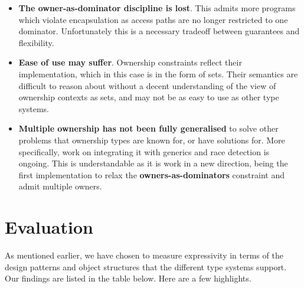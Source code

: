 \documentclass{acm_proc_article-sp}
\begin{document}
\begin{itemize}

    \item \textbf{The owner-as-dominator discipline is lost}. This admits more
        programs which violate encapsulation as access paths are no longer
        restricted to one dominator. Unfortunately this is a necessary tradeoff
        between guarantees and flexibility.

    \item \textbf{Ease of use may suffer}. Ownership constraints reflect their
        implementation, which in this case is in the form of sets. Their
        semantics are difficult to reason about without a decent understanding
        of the view of ownership contexts as sets, and may not be as easy to use
        as other type systems.

    \item \textbf{Multiple ownership has not been fully generalised} to solve
        other problems that ownership types are known for, or have solutions
        for. More specifically, work on integrating it with generics and race
        detection is ongoing.  This is understandable as it is work in a new
        direction, being the first implementation to relax the
        \textbf{owners-as-dominators} constraint and admit multiple owners.

\end{itemize}

\section{Evaluation}
\label{sec:eval}

As mentioned earlier, we have chosen to measure expressivity in terms of the
design patterns and object structures that the different type systems support.
Our findings are listed in the table below. Here are a few highlights.
\end{document}
